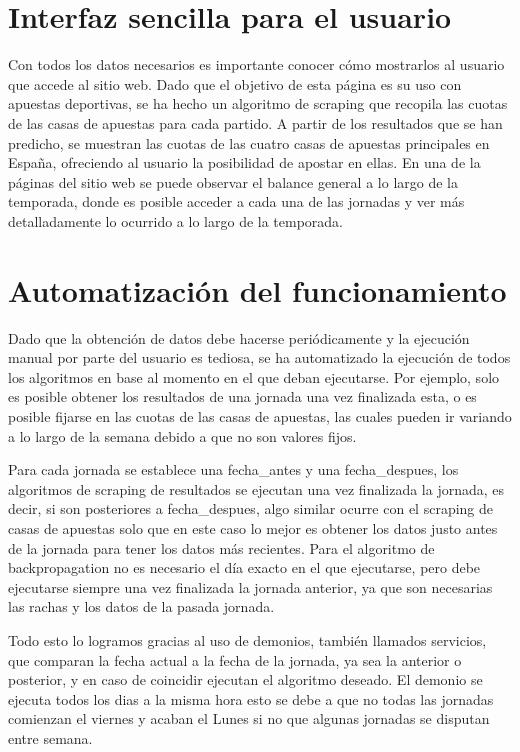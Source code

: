 \section{Interfaz sencilla para el usuario}

Con todos los datos necesarios es importante conocer cómo mostrarlos al usuario que accede al sitio web. Dado que el objetivo de esta página es su uso con apuestas deportivas, se ha hecho un algoritmo de scraping que recopila las cuotas de las casas de apuestas para cada partido.
A partir de los resultados que se han predicho, se muestran las cuotas de las cuatro casas de apuestas principales en España, ofreciendo al usuario la posibilidad de apostar en ellas.
En una de la páginas del sitio web se puede observar el balance general a lo largo de la temporada, donde es posible acceder a cada una de las jornadas y ver más detalladamente lo ocurrido a lo largo de la temporada.

\section{Automatización del funcionamiento}

Dado que la obtención de datos debe hacerse periódicamente y la ejecución manual por parte del usuario es tediosa, se ha automatizado la ejecución de todos los algoritmos en base al momento en el que deban ejecutarse. Por ejemplo, solo es posible obtener los resultados de una jornada una vez finalizada esta, o es posible fijarse en las cuotas de las casas de apuestas, las cuales pueden ir variando a lo largo de la semana debido a que no son valores fijos.

Para cada jornada se establece una fecha\_antes y una fecha\_despues, los algoritmos de scraping de resultados se ejecutan una vez finalizada la jornada, es decir, si son posteriores a fecha\_despues, algo similar ocurre con el scraping de casas de apuestas solo que en este caso lo mejor es obtener los datos justo antes de la jornada para tener los datos más recientes. Para el algoritmo de backpropagation no es necesario el día exacto en el que ejecutarse, pero debe ejecutarse siempre una vez finalizada la jornada anterior, ya que son necesarias las rachas y los datos de la pasada jornada.

Todo esto lo logramos gracias al uso de demonios, también llamados servicios, que comparan la fecha actual a la fecha de la jornada, ya sea la anterior o posterior, y en caso de coincidir ejecutan el algoritmo deseado. El demonio se ejecuta todos los dias a la misma hora esto se debe a que no todas las jornadas comienzan el viernes y acaban el Lunes si no que algunas jornadas se disputan entre semana.